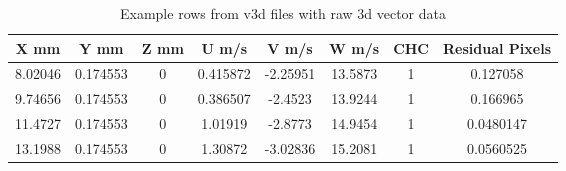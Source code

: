 \begin{table}[H]
\begin{center}
\begin{tabular}{|cccccccc|}
	\hline
	X mm & Y mm  & Z mm & U m/s & V m/s & W m/s & CHC & Residual Pixels\\
	\hline
	8.02046 & 0.174553 & 0 & 0.415872 & -2.25951 & 13.5873 & 1 & 0.127058\\
	9.74656 & 0.174553 & 0 & 0.386507 & -2.4523 & 13.9244 & 1 & 0.166965\\
	11.4727 & 0.174553 & 0 & 1.01919 & -2.8773 & 14.9454 & 1 & 0.0480147\\
	13.1988 & 0.174553 & 0 & 1.30872 & -3.02836 & 15.2081 & 1 & 0.0560525\\
	\hline
\end{tabular}
\caption{Example rows from v3d files with raw 3d vector data}
\label{table:v3d_row_example}
\end{center}
\end{table}
